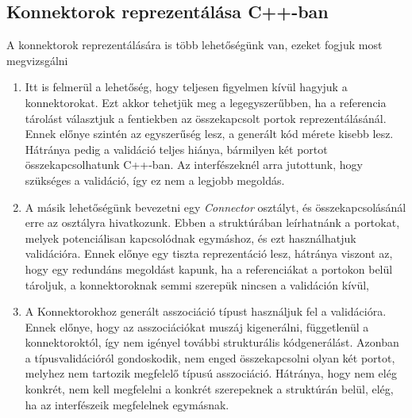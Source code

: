\documentclass[a4paper,12pt]{report}
\begin{document}
\subsection{Konnektorok reprezentálása C++-ban}
A konnektorok reprezentálására is több lehetőségünk van, ezeket fogjuk most megvizsgálni
\begin{enumerate}
\item Itt is felmerül a lehetőség, hogy teljesen figyelmen kívül hagyjuk a konnektorokat. Ezt akkor tehetjük meg a legegyszerűbben, ha a referencia tárolást választjuk a fentiekben az összekapcsolt portok reprezentálásánál. Ennek előnye szintén az egyszerűség lesz, a generált kód mérete kisebb lesz. Hátránya pedig a validáció teljes hiánya, bármilyen két portot összekapcsolhatunk C++-ban. Az interfészeknél arra jutottunk, hogy szükséges a validáció, így ez nem a legjobb megoldás.
\item A másik lehetőségünk bevezetni egy \textit{Connector} osztályt, és összekapcsolásánál erre az osztályra hivatkozunk. Ebben a struktúrában leírhatnánk a portokat, melyek potenciálisan kapcsolódnak egymáshoz, és ezt használhatjuk validációra. Ennek előnye egy tiszta reprezentáció lesz, hátránya viszont az, hogy egy redundáns megoldást kapunk, ha a referenciákat a portokon belül tároljuk, a konnektoroknak semmi szerepük nincsen a validáción kívül,
\item A Konnektorokhoz generált asszociáció típust használjuk fel a validációra. Ennek előnye, hogy az asszociációkat muszáj kigenerálni, függetlenül a konnektoroktól, így nem igényel további strukturális kódgenerálást. Azonban a típusvalidációról gondoskodik, nem enged összekapcsolni olyan két portot, melyhez nem tartozik megfelelő típusú asszociáció. Hátránya, hogy nem elég konkrét, nem kell megfelelni a konkrét szerepeknek a struktúrán belül, elég, ha az interfészeik megfelelnek egymásnak.

\end{enumerate}
\end{document}
